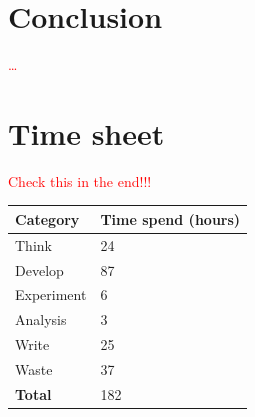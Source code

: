 \documentclass{stylesheet}
\begin{document}

\section{Conclusion}
\label{sec:conclusion}
\textcolor{red}{\ldots}

\appendix
\section{Time sheet}
\label{app:time}
\textcolor{red}{Check this in the end!!!}
\begin{table}[h]
\begin{tabular}{ll}
\hline
\textbf{Category} & \textbf{Time spend (hours)} \\
\hline
Think & 24 \\
Develop & 87 \\
Experiment & 6 \\
Analysis & 3 \\
Write & 25 \\
Waste & 37 \\
\textbf{Total} & 182 \\
\hline
\end{tabular}
\end{table}
\end{document}
